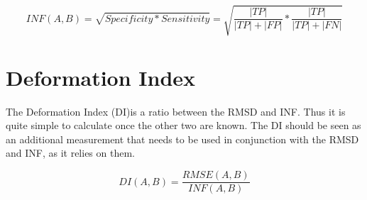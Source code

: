 \documentclass{article}
\begin{document}
\begin{equation}
    \label{eq:inf}
    INF(A, B) = \sqrt{Specificity * Sensitivity} = \sqrt{\frac{|TP|}{|TP| + |FP|} * \frac{|TP|}{|TP| + |FN|}}
\end{equation}

\section{Deformation Index}
The Deformation Index (DI)is a ratio between the RMSD and INF. Thus it is quite simple to calculate once the other two are known. The DI should be seen as an additional measurement that needs to be used in conjunction with the RMSD and INF, as it relies on them.

\begin{equation}
    \label{eq:di}
    DI(A, B) = \frac{RMSE(A, B)}{INF(A, B)}
\end{equation}
\end{document}

